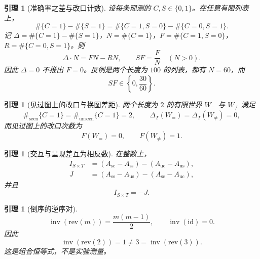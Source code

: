 \documentclass[UTF8,11pt,a4paper]{ctexart}
\theoremstyle{plain}
\newtheorem{lemma}[theorem]{引理}
\begin{document}
\begin{lemma}[准确率之差与改口计数]
\label{lem:gap-zh}
设每条观测的 $C,S\in\{0,1\}$。在任意有限列表上，
\begin{equation}
\#\{C=1\}-\#\{S=1\}=\#\{C=1,S=0\}-\#\{C=0,S=1\}.
\end{equation}
记 $\Delta=\#\{C=1\}-\#\{S=1\}$，$N=\#\{C=1\}$，$F=\#\{C=1,S=0\}$，$R=\#\{C=0,S=1\}$。则
\begin{equation}
\Delta\cdot N=FN-RN,
\qquad
SF=\frac{F}{N}\quad(N>0).
\end{equation}
因此 $\Delta=0$ 不推出 $F=0$。反例是两个长度为 $100$ 的列表，都有 $N=60$，而
\begin{equation}
SF\in\left\{0,\frac{30}{60}\right\}.
\end{equation}
\end{lemma}

\begin{lemma}[见过图上的改口与换图差距]
\label{lem:worlds-zh}
两个长度为 $2$ 的有限世界 $W_{=}$ 与 $W_{\neq}$ 满足
\begin{equation}
\#_{\mathrm{seen}}\{C=1\}=\#_{\mathrm{unseen}}\{C=1\}=2,
\qquad
\Delta_T(W_{=})=\Delta_T(W_{\neq})=0,
\end{equation}
而见过图上的改口次数为
\begin{equation}
F(W_{=})=0,\qquad F(W_{\neq})=1.
\end{equation}
\end{lemma}

\begin{lemma}[交互与呈现差互为相反数]
\label{lem:interaction-zh}
在整数上，
\begin{align}
I_{S\times T}
&=(A_{\mathrm{sc}}-A_{\mathrm{ss}})-(A_{\mathrm{uc}}-A_{\mathrm{us}}),\\
J
&=(A_{\mathrm{ss}}-A_{\mathrm{us}})-(A_{\mathrm{sc}}-A_{\mathrm{uc}}),
\end{align}
并且
\begin{equation}
I_{S\times T}=-J.
\end{equation}
\end{lemma}

\begin{lemma}[倒序的逆序对]
\label{lem:inversion-zh}
\begin{equation}
\operatorname{inv}(\mathrm{rev}(m))=\frac{m(m-1)}{2},
\qquad
\operatorname{inv}(\mathrm{id})=0.
\end{equation}
因此
\begin{equation}
\operatorname{inv}(\mathrm{rev}(2))=1\neq 3=\operatorname{inv}(\mathrm{rev}(3)).
\end{equation}
这是组合恒等式，不是实验测量。
\end{lemma}
\end{document}
